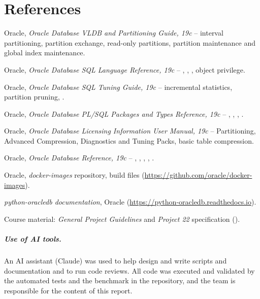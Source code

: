 \chapter*{References}

\begin{enumerate}[label={[\arabic*]}, leftmargin=*]
  \item Oracle, \emph{Oracle Database VLDB and Partitioning Guide, 19c} -- interval
        partitioning, partition exchange, read-only partitions, partition maintenance and
        global index maintenance.
  \item Oracle, \emph{Oracle Database SQL Language Reference, 19c} -- , , ,  object privilege.
  \item Oracle, \emph{Oracle Database SQL Tuning Guide, 19c} -- incremental statistics,
        partition pruning, .
  \item Oracle, \emph{Oracle Database PL/SQL Packages and Types Reference, 19c} --
        , , , .
  \item Oracle, \emph{Oracle Database Licensing Information User Manual, 19c} -- Partitioning,
        Advanced Compression, Diagnostics and Tuning Packs, basic table compression.
  \item Oracle, \emph{Oracle Database Reference, 19c} -- , ,
        , , .
  \item Oracle, \emph{docker-images} repository,  build
        files (\url{https://github.com/oracle/docker-images}).
  \item \emph{python-oracledb documentation}, Oracle (\url{https://python-oracledb.readthedocs.io}).
  \item Course material: \emph{General Project Guidelines} and \emph{Project 22} specification
        ().
\end{enumerate}

\paragraph{Use of AI tools.} An AI assistant (Claude) was used to help design and write
scripts and documentation and to run code reviews. All code was executed and validated by the
automated tests and the benchmark in the repository, and the team is responsible for the
content of this report.
